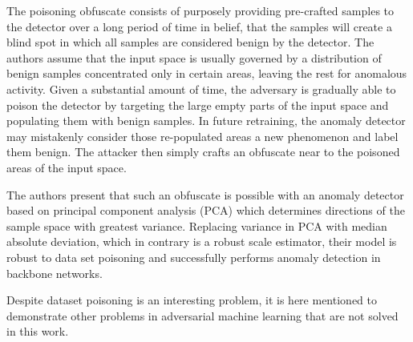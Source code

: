 The poisoning obfuscate consists of purposely providing pre-crafted
samples to the detector over a long period of time in belief, that the
samples will create a blind spot in which all samples are considered
benign by the detector. The authors assume that the input space is
usually governed by a distribution of benign samples concentrated only
in certain areas, leaving the rest for anomalous activity. Given a
substantial amount of time, the adversary is gradually able to poison
the detector by targeting the large empty parts of the input space and
populating them with benign samples. In future retraining, the anomaly
detector may mistakenly consider those re-populated areas a new
phenomenon and label them benign. The attacker then simply crafts an
obfuscate near to the poisoned areas of the input space.

The authors present that such an obfuscate is possible with an anomaly
detector based on principal component analysis (PCA) which determines
directions of the sample space with greatest variance. Replacing
variance in PCA with median absolute deviation, which in contrary is a
robust scale estimator, their model is robust to data set poisoning and
successfully performs anomaly detection in backbone networks.

Despite dataset poisoning is an interesting problem, it is here mentioned to demonstrate other problems in adversarial machine learning that are not solved in this work.

